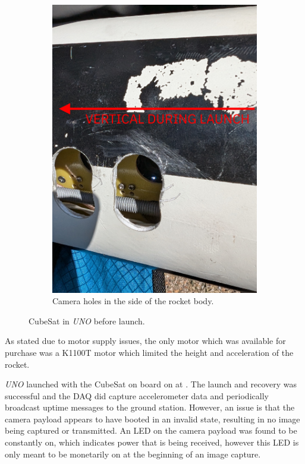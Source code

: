 \documentclass[]{report}
\begin{document}
\begin{figure}[H]
\begin{subfigure}{0.495\textwidth}
  \end{subfigure}
  \begin{subfigure}{0.495\textwidth}
    \centering
    \includegraphics[width=\linewidth]{images/camera-holes.jpg}
    \caption{Camera holes in the side of the rocket body.}
  \end{subfigure}
  \caption{CubeSat in \textit{UNO} before launch.}
  \label{fig:hpr-mounting}
\end{figure}

As stated due to motor supply issues, the only motor which was available for purchase was a K1100T motor which limited the height and acceleration of the rocket.

\textit{UNO} launched with the CubeSat on board on  at . The launch and recovery was successful and the DAQ did capture accelerometer data and periodically broadcast uptime messages to the ground station. However, an issue is that the camera payload appears to have booted in an invalid state, resulting in no image being captured or transmitted. An LED on the camera payload was found to be constantly on, which indicates power that is being received, however this LED is only meant to be monetarily on at the beginning of an image capture.
\end{document}
